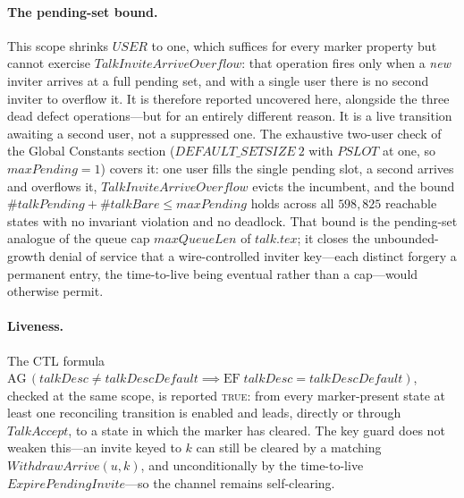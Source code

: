 \documentclass[a4paper,10pt,fleqn]{article}
\begin{document}
\paragraph{The pending-set bound.}  This scope shrinks $USER$ to one, which
suffices for every marker property but cannot exercise
$TalkInviteArriveOverflow$: that operation fires only when a \emph{new}
inviter arrives at a full pending set, and with a single user there is no
second inviter to overflow it.  It is therefore reported uncovered here,
alongside the three dead defect operations---but for an entirely different
reason.  It is a live transition awaiting a second user, not a suppressed one.
The exhaustive two-user check of the Global Constants section
($DEFAULT\_SETSIZE~2$ with $PSLOT$ at one, so $maxPending = 1$) covers it:
one user fills the single pending slot, a second arrives and overflows it,
$TalkInviteArriveOverflow$ evicts the incumbent, and the bound
$\# talkPending + \# talkBare \leq maxPending$ holds across all $598{,}825$
reachable states with no invariant violation and no deadlock.  That bound is
the pending-set analogue of the queue cap $maxQueueLen$ of $talk.tex$; it
closes the unbounded-growth denial of service that a wire-controlled inviter
key---each distinct forgery a permanent entry, the time-to-live being eventual
rather than a cap---would otherwise permit.

\paragraph{Liveness.}  The CTL formula
$\mathrm{AG}\,(talkDesc \neq talkDescDefault \implies
\mathrm{EF}\; talkDesc = talkDescDefault)$,
checked at the same scope, is reported \textsc{true}: from every
marker-present state at least one reconciling transition is enabled and
leads, directly or through $TalkAccept$, to a state in which the marker has
cleared.  The key guard does not weaken this---an invite keyed to $k$ can
still be cleared by a matching $WithdrawArrive(u, k)$, and unconditionally by
the time-to-live $ExpirePendingInvite$---so the channel remains
self-clearing.
\end{document}
